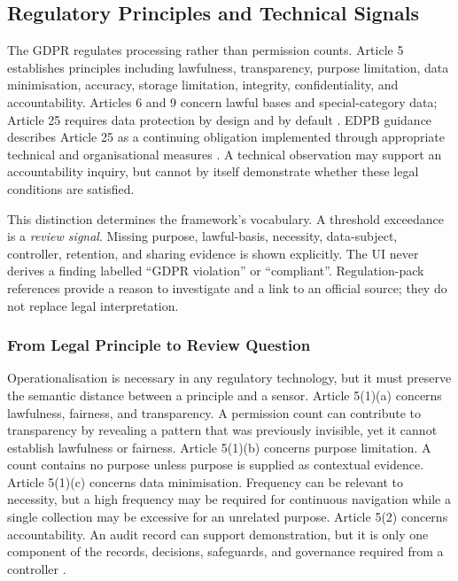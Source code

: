 \subsection{Regulatory Principles and Technical Signals}

The GDPR regulates processing rather than permission counts. Article 5 establishes principles including lawfulness, transparency, purpose limitation, data minimisation, accuracy, storage limitation, integrity, confidentiality, and accountability. Articles 6 and 9 concern lawful bases and special-category data; Article 25 requires data protection by design and by default \cite{eurlex2016}. EDPB guidance describes Article 25 as a continuing obligation implemented through appropriate technical and organisational measures \cite{edpb2019}. A technical observation may support an accountability inquiry, but cannot by itself demonstrate whether these legal conditions are satisfied.

This distinction determines the framework's vocabulary. A threshold exceedance is a \emph{review signal}. Missing purpose, lawful-basis, necessity, data-subject, controller, retention, and sharing evidence is shown explicitly. The UI never derives a finding labelled ``GDPR violation'' or ``compliant''. Regulation-pack references provide a reason to investigate and a link to an official source; they do not replace legal interpretation.

\subsubsection{From Legal Principle to Review Question}

Operationalisation is necessary in any regulatory technology, but it must preserve the semantic distance between a principle and a sensor. Article 5(1)(a) concerns lawfulness, fairness, and transparency. A permission count can contribute to transparency by revealing a pattern that was previously invisible, yet it cannot establish lawfulness or fairness. Article 5(1)(b) concerns purpose limitation. A count contains no purpose unless purpose is supplied as contextual evidence. Article 5(1)(c) concerns data minimisation. Frequency can be relevant to necessity, but a high frequency may be required for continuous navigation while a single collection may be excessive for an unrelated purpose. Article 5(2) concerns accountability. An audit record can support demonstration, but it is only one component of the records, decisions, safeguards, and governance required from a controller \cite{eurlex2016}.

